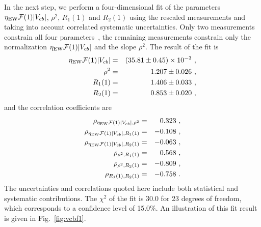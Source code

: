 In the next step, we perform a four-dimensional fit of the parameters
$\eta_\mathrm{EW}{\cal F}(1)|V_{cb}|$, $\rho^2$, $R_1(1)$ and $R_2(1)$
using the rescaled measurements and taking into account correlated
systematic uncertainties. Only two measurements constrain all four
parameters~\cite{Dungel:2010uk,Aubert:2006mb}, the remaining
measurements constrain only the normalization $\eta_\mathrm{EW}{\cal
  F}(1)|V_{cb}|$ and the slope $\rho^2$. The result of the fit is
\begin{eqnarray}
  \eta_\mathrm{EW}{\cal F}(1)|V_{cb}| & = & (35.81\pm 0.45)\times
  10^{-3}~, \label{eq:vcbf1} \\
  \rho^2 & = & 1.207\pm 0.026~,\\
  R_1(1) & = & 1.406\pm 0.033~, \label{eq:r1} \\
  R_2(1) & = & 0.853\pm 0.020~, \label{eq:r2}
\end{eqnarray}
and the correlation coefficients are
\begin{eqnarray}
  \rho_{\eta_\mathrm{EW}{\cal F}(1)|V_{cb}|,\rho^2} & = & 0.323~,\\
  \rho_{\eta_\mathrm{EW}{\cal F}(1)|V_{cb}|,R_1(1)} & = & -0.108~,\\
  \rho_{\eta_\mathrm{EW}{\cal F}(1)|V_{cb}|,R_2(1)} & = & -0.063~,\\
  \rho_{\rho^2,R_1(1)} & = & 0.568~,\\
  \rho_{\rho^2,R_2(1)} & = & -0.809~,\\
  \rho_{R_1(1),R_2(1)} & = & -0.758~.\\
\end{eqnarray}
The uncertainties and correlations quoted here include both
statistical and systematic contributions. The $\chi^2$ of the fit is
30.0 for 23 degrees of freedom, which corresponds to a confidence
level of 15.0\%. An illustration of this fit result is given in
Fig.~\ref{fig:vcbf1}.
